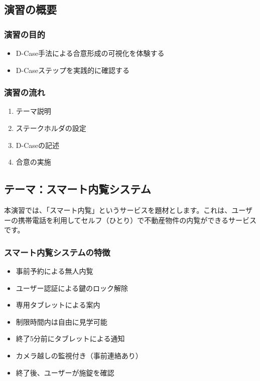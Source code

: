\subsection{演習の概要}

\subsubsection{演習の目的}
\begin{itemize}
    \item D-Case手法による合意形成の可視化を体験する
    \item D-Caseステップを実践的に確認する
\end{itemize}

\subsubsection{演習の流れ}
\begin{enumerate}
    \item テーマ説明
    \item ステークホルダの設定
    \item D-Caseの記述
    \item 合意の実施
\end{enumerate}

\subsection{テーマ：スマート内覧システム}

本演習では、「スマート内覧」というサービスを題材とします。これは、ユーザーの携帯電話を利用してセルフ（ひとり）で不動産物件の内覧ができるサービスです。

\subsubsection{スマート内覧システムの特徴}
\begin{itemize}
    \item 事前予約による無人内覧
    \item ユーザー認証による鍵のロック解除
    \item 専用タブレットによる案内
    \item 制限時間内は自由に見学可能
    \item 終了5分前にタブレットによる通知
    \item カメラ越しの監視付き（事前連絡あり）
    \item 終了後、ユーザーが施錠を確認
\end{itemize}

